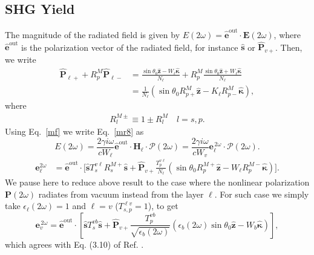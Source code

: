 \subsection{SHG Yield}

The magnitude of the radiated field is given by
$E(2\omega)=\hat{\mathbf{e}}^{\mathrm{out}}\cdot\mathbf{E}(2\omega)$, where
$\hat{\mathbf{e}}^{\mathrm{out}}$ is the polarization vector of the radiated
field, for instance $\hat{\mathbf{s}}$ or $\hat{\mathbf{P}}_{v+}$. Then, we
write
\begin{equation}\label{m1}
\begin{split}
\hat{\mathbf{P}}_{\ell +} + R^M_p\hat{\mathbf{P}}_{\ell -}
&= \frac{\sin\theta_0\hat{\mathbf{z}} - W_{\ell}\hat{\boldsymbol{\kappa}}}
        {N_{\ell}}
 + R^M_p
   \frac{\sin\theta_0\hat{\mathbf{z}} + W_{\ell}\hat{\boldsymbol{\kappa}}}
        {N_{\ell}}
\\
&= \frac{1}{N_{\ell}}
\left(
\sin\theta_0R^M_{p+}\hat{\mathbf{z}}
- K_{\ell}R^M_{p-}\hat{\boldsymbol{\kappa}}
\right)
,
\end{split}
\end{equation}
where
\begin{align}\label{rm}
R^{M\pm}_l\equiv 1 \pm R^M_l \quad l=s,p
.
\end{align}
 Using Eq.~\eqref{mf}
 we write Eq.~\eqref{mr8} as
\begin{equation}\label{r10}
E(2\omega) = \frac{2\gamma i \omega}{cW_\ell}
\hat{\mathbf{e}}^{\mathrm{out}}\cdot 
\mathbf{H}_{\ell}\cdot 
\boldsymbol{\mathcal{P}}(2\omega) 
= \frac{2\gamma i \omega}{cW_v}
 \mathbf{e}^{\,2\omega}_{\ell}\cdot\boldsymbol{\mathcal{P}}(2\omega). 
\end{equation}
\begin{equation}\label{r12mm}
\begin{split}
\mathbf{e}^{2\omega}_{\ell} &=\hat{\mathbf{e}}^{\mathrm{out}}\cdot 
\Bigg[
\hat{\mathbf{s}}T_{s}^{v\ell}R^{M+}_s\hat{\mathbf{s}} + 
\hat{\mathbf{P}}_{v+}
\frac{T^{v\ell}_{p}}
     {N_\ell}
\left(
\sin\theta_0R^{M+}_p\hat{\mathbf{z}}
- W_{\ell}R^{M-}_p\hat{\boldsymbol{\kappa}}
\right) 
\Bigg]
. 
\end{split}
\end{equation}  
 We pause here to reduce above result to the case where the nonlinear
polarization $\mathbf{P}(2\omega)$ radiates from vacuum instead from the layer
$\ell$. For such case we simply take $\epsilon_{\ell}(2\omega)=1$ and $\ell=v$
($T^{\ell v}_{s,p}=1$), to get
\begin{equation}\label{r13}
\mathbf{e}^{\,2\omega}_{v} = \hat{\mathbf{e}}^{\mathrm{out}}
\cdot\left[
\hat{\mathbf{s}}T_s^{v b}\hat{\mathbf{s}} + \hat{\mathbf{P}}_{v+}
\frac{T^{v b}_{p}}{\sqrt{\epsilon_{b}(2\omega)}}
\left(
  \epsilon_{b}(2\omega)\sin\theta_0\hat{\mathbf{z}}
  - W_{b}\hat{\boldsymbol{\kappa}}
\right) 
\right] 
,
\end{equation}
which agrees with Eq. (3.10) of Ref. \cite{mizrahiJOSA88}.

